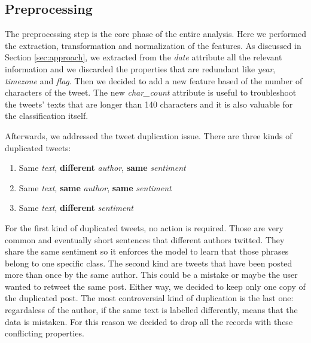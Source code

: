 \documentclass[conference]{IEEEtran}
\begin{document}
\subsection{Preprocessing}\label{sec:preprocessing}
The preprocessing step is the core phase of the entire analysis. Here we performed the extraction, transformation and normalization of the features. As discussed in Section \ref{sec:approach}, we extracted from the \textit{date} attribute all the relevant information and we discarded the properties that are redundant like \textit{year}, \textit{timezone} and \textit{flag}. Then we decided to add a new feature based of the number of characters of the tweet. The new \textit{char\_count} attribute is useful to troubleshoot the tweets' texts that are longer than 140 characters and it is also valuable for the classification itself.

Afterwards, we addressed the tweet duplication issue. There are three kinds of duplicated tweets:
\begin{enumerate}
    \item Same \textit{text}, \textbf{different} \textit{author}, \textbf{same} \textit{sentiment}
    \item Same \textit{text}, \textbf{same} \textit{author}, \textbf{same} \textit{sentiment}
    \item Same \textit{text}, \textbf{different} \textit{sentiment}
\end{enumerate}
For the first kind of duplicated tweets, no action is required. Those are very common and eventually short sentences that different authors twitted. They share the same sentiment so it enforces the model to learn that those phrases belong to one specific class. The second kind are tweets that have been posted more than once by the same author. This could be a mistake or maybe the user wanted to retweet the same post. Either way, we decided to keep only one copy of the duplicated post. The most controversial kind of duplication is the last one: regardaless of the author, if the same text is labelled differently, means that the data is mistaken. %
For this reason we decided to drop all the records with these conflicting properties.
\end{document}
